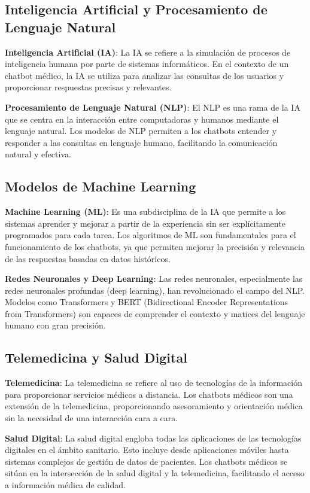 
\subsection{Inteligencia Artificial y Procesamiento de Lenguaje Natural}

\textbf{Inteligencia Artificial (IA)}: La IA se refiere a la simulación de procesos de inteligencia humana por parte de sistemas informáticos. En el contexto de un chatbot médico, la IA se utiliza para analizar las consultas de los usuarios y proporcionar respuestas precisas y relevantes.

\textbf{Procesamiento de Lenguaje Natural (NLP)}: El NLP es una rama de la IA que se centra en la interacción entre computadoras y humanos mediante el lenguaje natural. Los modelos de NLP permiten a los chatbots entender y responder a las consultas en lenguaje humano, facilitando la comunicación natural y efectiva.

\subsection{Modelos de Machine Learning}

\textbf{Machine Learning (ML)}: Es una subdisciplina de la IA que permite a los sistemas aprender y mejorar a partir de la experiencia sin ser explícitamente programados para cada tarea. Los algoritmos de ML son fundamentales para el funcionamiento de los chatbots, ya que permiten mejorar la precisión y relevancia de las respuestas basadas en datos históricos.

\textbf{Redes Neuronales y Deep Learning}: Las redes neuronales, especialmente las redes neuronales profundas (deep learning), han revolucionado el campo del NLP. Modelos como Transformers y BERT (Bidirectional Encoder Representations from Transformers) son capaces de comprender el contexto y matices del lenguaje humano con gran precisión.

\subsection{Telemedicina y Salud Digital}

\textbf{Telemedicina}: La telemedicina se refiere al uso de tecnologías de la información para proporcionar servicios médicos a distancia. Los chatbots médicos son una extensión de la telemedicina, proporcionando asesoramiento y orientación médica sin la necesidad de una interacción cara a cara.

\textbf{Salud Digital}: La salud digital engloba todas las aplicaciones de las tecnologías digitales en el ámbito sanitario. Esto incluye desde aplicaciones móviles hasta sistemas complejos de gestión de datos de pacientes. Los chatbots médicos se sitúan en la intersección de la salud digital y la telemedicina, facilitando el acceso a información médica de calidad.